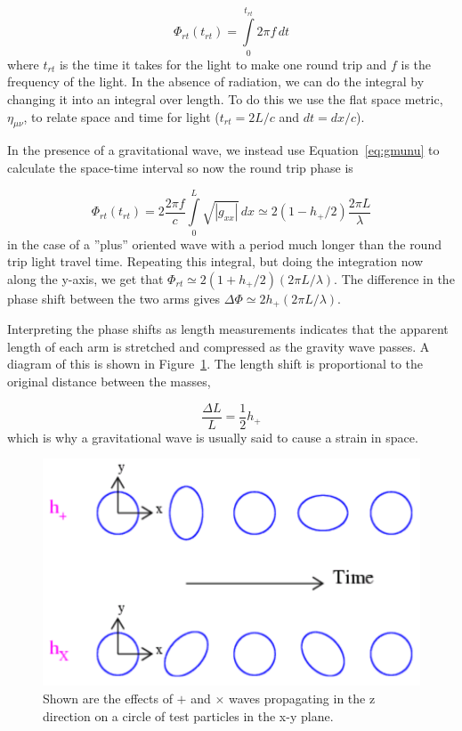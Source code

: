 \begin{equation}
\Phi_{rt}(t_{rt}) = \int\limits_{0}^{t_{rt}} 2 \pi f \, dt
\label{eq:roundtripflat}
\end{equation}
where $t_{rt}$ is the time it takes for the light to make one round trip and
$f$ is the frequency of the light. In the absence of radiation, we can do the
integral by changing it into an integral over length. To do this we use the 
flat space metric, $\eta_{\mu \nu}$, to relate space and time for light
($t_{rt} = 2 L/c$ and $dt = dx / c$). 

In the presence of a gravitational wave, we instead use Equation~\ref{eq:gmunu} to calculate
the space-time interval so now the round trip phase is

\begin{equation}
\Phi_{rt}(t_{rt}) = 2 \frac{2 \pi f}{c} \int\limits_{0}^{L} \sqrt{|g_{xx}|} \, dx
                    \simeq 2 (1 - h_{+}/2) \frac{2 \pi L}{\lambda}
\label{eq:roundtrip}
\end{equation}
in the case of a ''plus'' oriented wave with a period much longer than the round trip
light travel time. Repeating this integral, but doing the
integration now along the y-axis, we get that 
$\Phi_{rt} \simeq 2 (1 + h_{+}/2) (2 \pi L / \lambda)$. The difference
in the phase shift between the two arms gives 
$\Delta \Phi \simeq 2 h_{+} (2 \pi L / \lambda)$. 

Interpreting the phase shifts as length measurements indicates that the apparent 
length of each arm is stretched and compressed as the gravity wave passes. 
A diagram of this is shown in Figure~\ref{fig:CropCircles}. The
length shift is proportional to the original distance between the masses,

\begin{equation}
\frac{\Delta L}{L} = \frac{1}{2} h_+
\label{eq:h}
\end{equation}
which is why a gravitational wave is usually said to cause a strain in space.


\begin{figure}[!h]
\centerline{\includegraphics[angle=0,width=6.5in]{Figures/Chap1/CropCircles.png}}
\caption[Effect of gravitational waves on Test particles]{Shown are the effects of $+$ and
         $\times$ waves propagating in the z direction on a circle of test particles
         in the x-y plane.}
\label{fig:CropCircles}
\end{figure}


